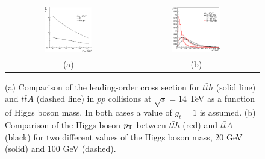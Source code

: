 \documentclass[preprintnumbers,superscriptaddress,nofootinbib,aps,prd,floatfix]{revtex4}
\newcommand{\pt}{p_{\rm{T}}}
\newcommand{\ttbar}{\ensuremath{t\bar{t}}}
\begin{document}
\begin{figure}[htbp]
\begin{center}
\begin{tabular}{cc}
\includegraphics[width=0.4\textwidth]{Figures/XSec.eps} &
\includegraphics[width=0.4\textwidth]{Figures/hpt.eps} \\
(a) & (b) \\
\end{tabular}
\caption{\small {(a) Comparison of the leading-order cross section for $\ttbar h$ (solid line) and 
$\ttbar A$ (dashed line) in $pp$ collisions at $\sqrt{s}=14$ TeV as a function of Higgs boson mass.
In both cases a value of $g_t = 1$ is assumed. (b) Comparison of the Higgs boson $\pt$ between 
$\ttbar h$ (red) and $\ttbar A$ (black) for two different values of the Higgs boson mass, 20 GeV (solid) and 100 GeV (dashed).}}
\label{fig:xsect_pTA_ttA} 
\end{center}
\end{figure}
\end{document}
